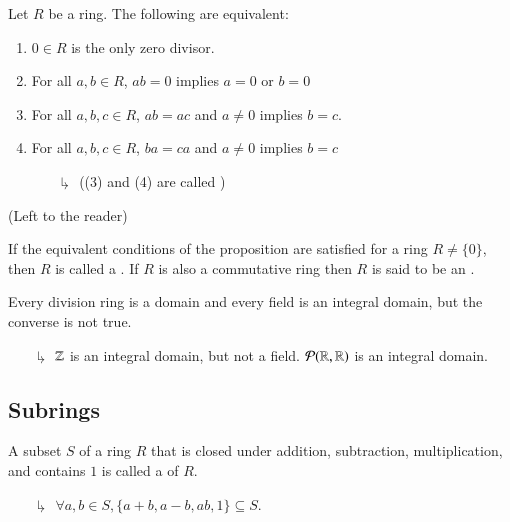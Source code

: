 \documentclass[12pt, a4paper, twoside, openright, titlepage]{book}
\begin{document}
\begin{prop}{}{}
    Let $R$ be a ring. The following are equivalent:
    \begin{enumerate}
        \item $0\in R$ is the only zero divisor.
        \item For all $a,b \in R$, $ab = 0$ implies $a = 0$ or $b = 0$
        \item For all $a,b,c \in R$, $ab = ac$ and $a \neq 0$ implies $b = c$.
        \item For all $a,b,c \in R$, $ba = ca$ and $a \neq 0$ implies $b = c$
        \begin{enumerate}
            \item[$\drsh$] ((3) and (4) are called )
        \end{enumerate}
    \end{enumerate}
    \begin{proof*}{}{}
        (Left to the reader)
    \end{proof*}
\end{prop}

\begin{defn}{}{}
    If the equivalent conditions of the proposition are satisfied for a ring $R \neq \{0\}$, then $R$ is called a . If $R$ is also a commutative ring then $R$ is said to be an .
\end{defn}

\begin{rmk}{}{}
    Every division ring is a domain and every field is an integral domain, but the converse is not true.
    \begin{enumerate}
        \item[$\drsh$] $\mathbb Z$ is an integral domain, but not a field. $\mathcal{P}(\mathbb R,\mathbb R)$ is an integral domain. 
    \end{enumerate}
\end{rmk}

\subsection{\textsection Subrings}

\begin{defn}{}{}
    A subset $S$ of a ring $R$ that is closed under addition, subtraction, multiplication, and contains $1$ is called a  of $R$.
    \begin{enumerate}
        \item[$\drsh$] $\forall a,b \in S, \{a+b,a-b,ab,1\} \subseteq S$.
    \end{enumerate}
\end{defn}
\end{document}
